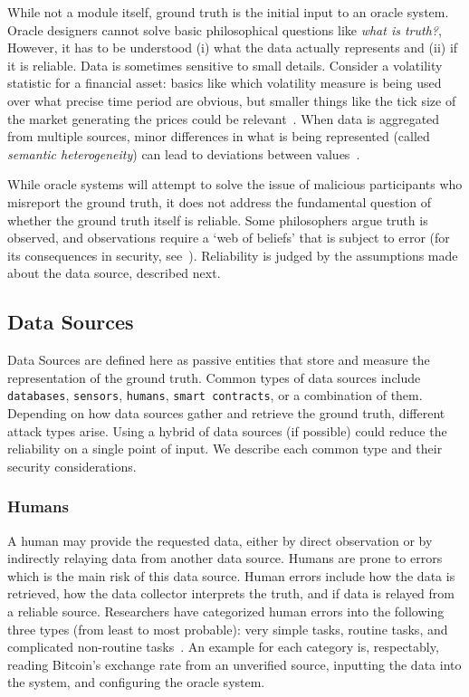 While not a module itself, ground truth is the initial input to an oracle system. Oracle designers cannot solve basic philosophical questions like \textit{what is truth?}, However, it has to be understood (i) what the data actually represents and (ii) if it is reliable. Data is sometimes sensitive to small details. Consider a volatility statistic for a financial asset: basics like which volatility measure is being used over what precise time period are obvious, but smaller things like the tick size of the market generating the prices could be relevant~\cite{firat2002knowledge}. When data is aggregated from multiple sources, minor differences in what is being represented (called \emph{semantic heterogeneity}) can lead to deviations between values~\cite{madnick2006improving,worboys1991semantic,hakimpour2001resolving}.

While oracle systems will attempt to solve the issue of malicious participants who misreport the ground truth, it does not address the fundamental question of whether the ground truth itself is reliable. Some philosophers argue truth is observed, and observations require a `web of beliefs' that is subject to error (for its consequences in security, see~\cite{HvO17}). Reliability is judged by the assumptions made about the data source, described next. 


\subsection{Data Sources}\label{data_sources}

Data Sources are defined here as passive entities that store and measure the representation of the ground truth. Common types of data sources include \texttt{databases}, \texttt{sensors}, \texttt{humans}, \texttt{smart contracts}, or a combination of them. Depending on how data sources gather and retrieve the ground truth, different attack types arise. Using a hybrid of data sources (if possible) could reduce the reliability on a single point of input. We describe each common type and their security considerations.

\subsubsection{Humans}\label{humansDatasource}
A human may provide the requested data, either by direct observation or by indirectly relaying data from another data source. Humans are prone to errors which is the main risk of this data source. Human errors include how the data is retrieved, how the data collector interprets the truth, and if data is relayed from a reliable source. Researchers have categorized human errors into the following three types (from least to most probable): very simple tasks, routine tasks, and complicated non-routine tasks~\cite{lo2020reliability}. An example for each category is, respectably, reading Bitcoin's exchange rate from an unverified source, inputting the data into the system, and configuring the oracle system.

